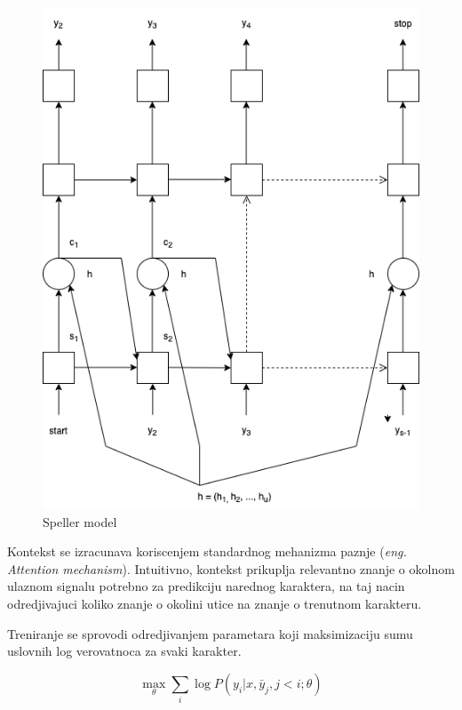 \documentclass[a4paper]{article}
\begin{document}
\begin{figure}[h!]
  \begin{center}
    \includegraphics[scale=0.3]{speller.png}
  \end{center}
  \caption{Speller model}
  \label{fig:speller_model}
\end{figure}

\bigskip

Kontekst se izracunava koriscenjem standardnog mehanizma paznje (\textit{eng. Attention mechanism}).  Intuitivno, kontekst prikuplja relevantno znanje o okolnom ulaznom signalu potrebno za predikciju narednog karaktera,  na taj nacin odredjivajuci koliko znanje o okolini utice na znanje o trenutnom karakteru.

Treniranje se sprovodi odredjivanjem parametara koji maksimizaciju sumu uslovnih log verovatnoca za svaki karakter.

 \begin{equation}
\label{eq:max}
\max_{\theta} \sum_i \log P(y_i | x,  \bar{y}_j,  j < i; \theta)
\end{equation}
\end{document}
